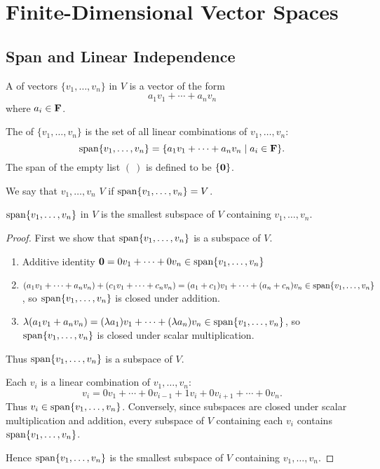 \chapter{Finite-Dimensional Vector Spaces}\label{chap:finite-dim-vector-spaces}
\section{Span and Linear Independence}
\begin{definition}
A  of vectors $\{v_1,\dots,v_n\}$ in $V$ is a vector of the form
\[a_1v_1+\cdots+a_nv_n\]
where $a_i\in\mathbf F$.
\end{definition}

\begin{definition}[Span]
The  of $\{v_1,\dots,v_n\}$ is the set of all linear combinations of $v_1,\dots,v_n$:
\[\operatorname{span}\{v_1,\dots,v_n\}=\{a_1v_1+\cdots+a_nv_n\mid a_i\in\mathbf F\}.\]
The span of the empty list $(\:)$ is defined to be $\{\vb{0}\}$.

We say that $v_1,\dots,v_n$  $V$ if $\operatorname{span}\{v_1,\dots,v_n\}=V$.
\end{definition}

\begin{proposition}
$\operatorname{span}\{v_1,\dots,v_n\}$ in $V$ is the smallest subspace of $V$ containing $v_1,\dots,v_n$.
\end{proposition}

\begin{proof}
First we show that $\operatorname{span}\{v_1,\dots,v_n\}$ is a subspace of $V$.
\begin{enumerate}[label=(\roman*)]
\item Additive identity $\vb{0}=0v_1+\cdots+0v_n\in\operatorname{span}\{v_1,\dots,v_n\}$
\item $(a_1v_1+\cdots+a_nv_n)+(c_1v_1+\cdots+c_nv_n)=(a_1+c_1)v_1+\cdots+(a_n+c_n)v_n\in\operatorname{span}\{v_1,\dots,v_n\}$, so $\operatorname{span}\{v_1,\dots,v_n\}$ is closed under addition.
\item $\lambda(a_1v_1+a_nv_n)=(\lambda a_1)v_1+\cdots+(\lambda a_n)v_n\in\operatorname{span}\{v_1,\dots,v_n\}$, so $\operatorname{span}\{v_1,\dots,v_n\}$ is closed under scalar multiplication.
\end{enumerate}
Thus $\operatorname{span}\{v_1,\dots,v_n\}$ is a subspace of $V$.

Each $v_i$ is a linear combination of $v_1,\dots,v_n$:
\[v_i=0v_1+\cdots+0v_{i-1}+1v_i+0v_{i+1}+\cdots+0v_n.\]
Thus $v_i\in\operatorname{span}\{v_1,\dots,v_n\}$. Conversely, since subspaces are closed under scalar multiplication and addition, every subspace of $V$ containing each $v_i$ contains $\operatorname{span}\{v_1,\dots,v_n\}$.

Hence $\operatorname{span}\{v_1,\dots,v_n\}$ is the smallest subspace of $V$ containing $v_1,\dots,v_n$.
\end{proof}


